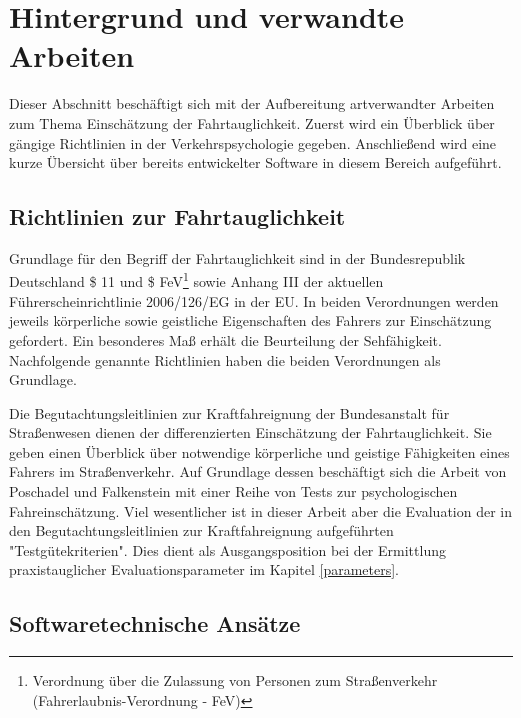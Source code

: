\section{Hintergrund und verwandte Arbeiten}
\label{relatedWork}
Dieser Abschnitt beschäftigt sich mit der Aufbereitung artverwandter Arbeiten zum Thema Einschätzung der Fahrtauglichkeit. Zuerst wird ein Überblick über gängige Richtlinien in der Verkehrspsychologie gegeben. Anschließend wird eine kurze Übersicht über bereits entwickelter Software in diesem Bereich aufgeführt. 

\subsection{Richtlinien zur Fahrtauglichkeit} 

Grundlage für den Begriff der Fahrtauglichkeit sind in der Bundesrepublik Deutschland \$ 11 und \$ FeV\footnote{\label{foot:fev}Verordnung über die Zulassung von Personen zum Straßenverkehr (Fahrerlaubnis-Verordnung - FeV)} sowie Anhang III der aktuellen Führerscheinrichtlinie 2006/126/EG in der EU. In beiden Verordnungen werden jeweils körperliche sowie geistliche Eigenschaften des Fahrers zur Einschätzung gefordert. Ein besonderes Maß erhält die Beurteilung der Sehfähigkeit. Nachfolgende genannte Richtlinien haben die beiden Verordnungen als Grundlage.

Die Begutachtungsleitlinien zur Kraftfahreignung der Bundesanstalt für Straßenwesen \cite{begutachtungsrichtlinien} dienen der differenzierten Einschätzung der Fahrtauglichkeit. Sie geben einen Überblick über notwendige körperliche und geistige Fähigkeiten eines Fahrers im Straßenverkehr.
Auf Grundlage dessen beschäftigt sich die Arbeit von Poschadel und Falkenstein \cite{testverfahrenpsychometrischefahreignung} mit einer Reihe von Tests zur psychologischen Fahreinschätzung. Viel wesentlicher ist in dieser Arbeit aber die Evaluation der in den Begutachtungsleitlinien zur Kraftfahreignung \cite{begutachtungsrichtlinien} aufgeführten "Testgütekriterien". Dies dient als Ausgangsposition bei der Ermittlung praxistauglicher Evaluationsparameter im Kapitel \ref{parameters}.

\subsection{Softwaretechnische Ansätze}